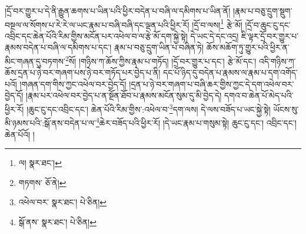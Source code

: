 །དྲོ་བར་གྱུར་པ་དེ་ནི་རྒྱུན་ཆགས་པ་ཡིན་པའི་ཕྱིར་བདེན་པ་བཞི་ལ་དམིགས་པ་ཡིན་ནོ། །རྣམ་པ་བཅུ་དྲུག་སྡུག་བསྔལ་ལ་སོགས་པ་རེ་རེ་ལ་ཡང་རྣམ་པ་བཞི་བཞི་དང་ལྡན་པའི་ཕྱིར་རོ། །དྲོ་བ་ལས།\footnote{ལ།  སྣར་ཐང་། } རྩེ་མོ། །དྲོ་བ་ཆུང་ངུ་དང་འབྲིང་དང་ཆེན་པོའི་རིམ་གྱིས་མངོན་པར་འཕེལ་བ་ལ་རྩེ་མོ་དག་སྐྱེ་སྟེ། དེ་ཡང་དེ་དང་འདྲ། ཇི་ལྟར་དྲོ་བར་གྱུར་པ་རྣམས་བདེན་པ་བཞི་ལ་དམིགས་པ་དང་། རྣམ་པ་བཅུ་དྲུག་ཡིན་པ་བཞིན་ཏེ། ཆོས་མཆོག་ཏུ་གྱུར་པའི་ཕྱིར་ན་མིང་གཞན་དུ་བཏགས་\footnote{གཏགས་  ཅོ་ནེ། }སོ། །གཉིས་ཀ་ཆོས་ཀྱིས་རྣམ་པ་གཏོད། །དྲོ་བར་གྱུར་པ་དང་། རྩེ་མོ་དང་། འདི་གཉིས་ཀ་ཆོས་དྲན་པ་ཉེ་བར་གཞག་པས་ཉེ་བར་གཏོད་པར་བྱེད་པ་ནི། དང་པོ་ཉིད་དུ་བདེན་པ་རྣམས་ལ་རྣམ་པ་དག་འགོད་པའོ། །གཞན་དག་གིས་ཀྱང་འཕེལ་བར་བྱེད་དོ། །དྲན་པ་ཉེ་བར་གཞག་པ་བཞི་ཆར་གྱིས་ཀྱང་དེ་དག་འཕེལ་བར་བྱེད་དོ། །རྣམ་པར་འཕེལ་བར་བྱེད་པ་ན་སྔོན་ཐོབ་པ་རྣམས་མངོན་སུམ་དུ་མི་བྱེད་དེ། དགའ་བ་ཆེན་པོ་མེད་པའི་ཕྱིར་རོ། །ཆུང་ངུ་དང་འབྲིང་དང་། ཆེན་པོའི་རིམ་གྱིས་:འཕེལ་བ་\footnote{འཕེལ་བར་  སྣར་ཐང་།  པེ་ཅིན། }དག་ལས། དེ་ལས་བཟོད་པ་ཡང་སྐྱེ་སྟེ། ཡོངས་སུ་མི་ཉམས་པའི་:སྒོ་ནས་བདེན་པ་ལ་\footnote{སྒོ་ནས་  སྣར་ཐང་།  པེ་ཅིན། }ཆེར་བཟོད་པའི་ཕྱིར་རོ། །དེ་ཡང་རྣམ་པ་གསུམ་སྟེ། ཆུང་ངུ་དང་། འབྲིང་དང་། ཆེན་པོའོ། །
